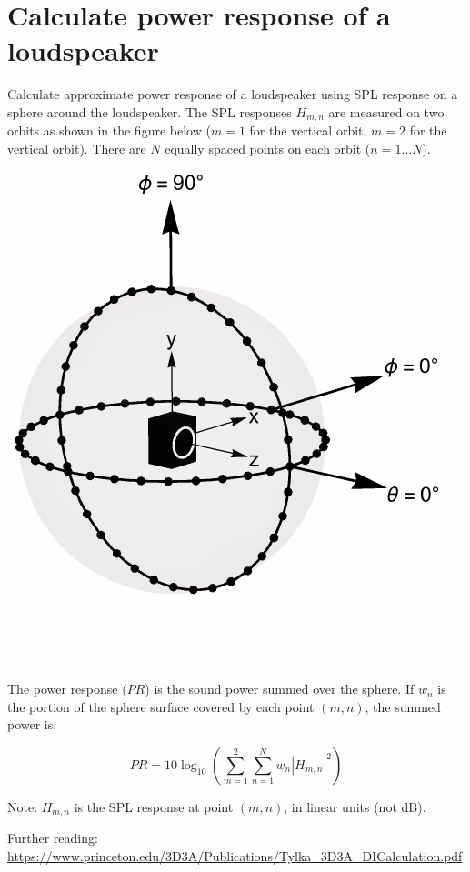 \documentclass{article}
\begin{document}
\section*{Calculate power response of a loudspeaker}

Calculate approximate power response of a loudspeaker using SPL response on a sphere around the loudspeaker. The SPL responses $H_{m,n}$ are measured on two orbits as shown in the figure below ($m=1$ for the vertical orbit, $m=2$ for the vertical orbit). There are $N$ equally spaced points on each orbit ($n = 1\ldots N$).

\centerline{\includegraphics[width=0.3\linewidth]{orbits.pdf}}

The power response ($PR$) is the sound power summed over the sphere. If $w_n$ is the portion of the sphere surface covered by each point $(m,n)$, the summed power is:

\begin{equation*}
  PR = 10 \log_{10} \left( \sum_{m=1}^{2} \sum_{n=1}^{N} w_n |H_{m,n}|^2  \right) 
\end{equation*}

Note: $H_{m,n}$ is the SPL response at point $(m,n)$, in linear units (not dB).

Further reading: \url{https://www.princeton.edu/3D3A/Publications/Tylka_3D3A_DICalculation.pdf}
\end{document}
